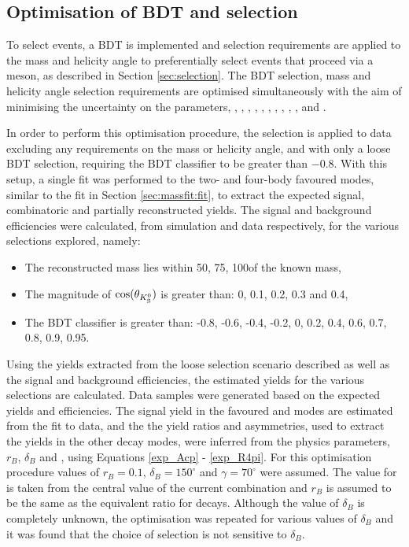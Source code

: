 \subsection{Optimisation of BDT and \Kstar selection}
\label{sec:cpfit:optimisation}

To select \btodkst events, a BDT is implemented and selection requirements are applied to the \Kstar mass and \KS helicity angle to preferentially select events that proceed via a \Kstar meson, as described in Section \ref{sec:selection}. The BDT selection, \Kstar mass and \KS helicity angle selection requirements are optimised simultaneously with the aim of minimising the uncertainty on the \CP parameters, \Akpi, \Akk, \Apipi, \Rkk, \Rpipi, \Rptwo, \Rmtwo, \Akpipipi, \Apipipipi, \Rpipipipi, \Rpfour and \Rmfour. 

In order to perform this optimisation procedure, the selection is applied to data excluding any requirements on the \Kstarm mass or \KS helicity angle, and with only a loose BDT selection, requiring the BDT classifier to be greater than $-0.8$. With this setup, a single fit was performed to the two- and four-body favoured modes, similar to the fit in Section \ref{sec:massfit:fit}, to extract the expected signal, combinatoric and partially reconstructed yields. The signal and background efficiencies were calculated, from simulation and data respectively, for the various selections explored, namely:

\begin{itemize}
\item{The reconstructed \Kstarm mass lies within 50\mevcc, 75\mevcc, 100\mevcc of the known \Kstarm mass,}
\item{The magnitude of $\cos(\theta_{{{K}^0_{\mathrm{ \scriptscriptstyle S}}}})$ is greater than: 0, 0.1, 0.2, 0.3 and 0.4,}
\item{The BDT classifier is greater than: -0.8, -0.6, -0.4, -0.2, 0, 0.2, 0.4, 0.6, 0.7, 0.8, 0.9, 0.95.}
\end{itemize}

Using the yields extracted from the loose selection scenario described as well as the signal and background efficiencies, the estimated yields for the various selections are calculated. Data samples were generated based on the expected yields and efficiencies. The signal yield in the favoured \kpi and \kpipipi modes are estimated from the fit to data, and the the yield ratios and asymmetries, used to extract the yields in the other \Dz decay modes, were inferred from the physics parameters, $r_B$, $\delta_B$ and \Pgamma, using Equations \ref{exp_Acp} - \ref{exp_R4pi}. For this optimisation procedure values of $r_B = 0.1$, $\delta_B = 150^{\circ}$ and $\gamma = 70^{\circ}$ were assumed. The value for \Pgamma is taken from the central value of the current \lhcb combination and $r_B$ is assumed to be the same as the equivalent ratio for \decay{\Bm}{\D\Km} decays. Although the value of $\delta_B$ is completely unknown, the optimisation was repeated for various values of $\delta_B$ and it was found that the choice of selection is not sensitive to $\delta_B$.

